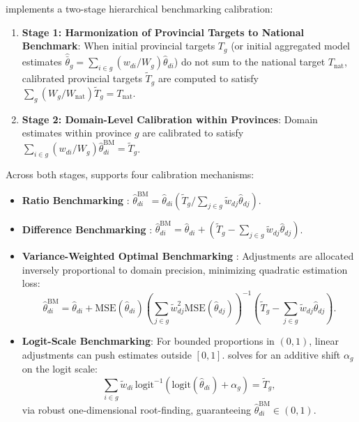 \documentclass[article]{jss}
\begin{document}
 implements a two-stage hierarchical benchmarking calibration:
%
\begin{enumerate}
  \item \textbf{Stage 1: Harmonization of Provincial Targets to National Benchmark}: When initial provincial targets $T_g$ (or initial aggregated model estimates $\hat{\bar{\theta}}_g = \sum_{i \in g} (w_{di}/W_g)\hat{\theta}_{di}$) do not sum to the national target $T_{\text{nat}}$, calibrated provincial targets $\tilde{T}_g$ are computed to satisfy $\sum_g (W_g / W_{\text{nat}}) \tilde{T}_g = T_{\text{nat}}$.
  \item \textbf{Stage 2: Domain-Level Calibration within Provinces}: Domain estimates within province $g$ are calibrated to satisfy $\sum_{i \in g} (w_{di}/W_g) \hat{\theta}_{di}^{\text{BM}} = \tilde{T}_g$.
\end{enumerate}
%
Across both stages,  supports four calibration mechanisms:
%
\begin{itemize}
  \item \textbf{Ratio Benchmarking} \citep{you2002small}: $\hat{\theta}_{di}^{\text{BM}} = \hat{\theta}_{di} \left( \tilde{T}_g / \sum_{j \in g} \tilde{w}_{dj} \hat{\theta}_{dj} \right)$.
  \item \textbf{Difference Benchmarking} \citep{rao2015small}: $\hat{\theta}_{di}^{\text{BM}} = \hat{\theta}_{di} + \left( \tilde{T}_g - \sum_{j \in g} \tilde{w}_{dj} \hat{\theta}_{dj} \right)$.
  \item \textbf{Variance-Weighted Optimal Benchmarking} \citep{datta2011bayesian, steorts2014benchmarking}: Adjustments are allocated inversely proportional to domain precision, minimizing quadratic estimation loss:
  \begin{equation}
  \hat{\theta}_{di}^{\text{BM}} = \hat{\theta}_{di} + \mathrm{MSE}(\hat{\theta}_{di}) \left( \sum_{j \in g} \tilde{w}_{dj}^2 \mathrm{MSE}(\hat{\theta}_{dj}) \right)^{-1} \left( \tilde{T}_g - \sum_{j \in g} \tilde{w}_{dj} \hat{\theta}_{dj} \right).
  \end{equation}
  \item \textbf{Logit-Scale Benchmarking}: For bounded proportions in $(0, 1)$, linear adjustments can push estimates outside $[0, 1]$.  solves for an additive shift $\alpha_g$ on the logit scale:
  \begin{equation}
  \sum_{i \in g} \tilde{w}_{di} \, \mathrm{logit}^{-1}\left( \mathrm{logit}(\hat{\theta}_{di}) + \alpha_g \right) = \tilde{T}_g,
  \end{equation}
  via robust one-dimensional root-finding, guaranteeing $\hat{\theta}_{di}^{\text{BM}} \in (0, 1)$.
\end{itemize}
\end{document}
